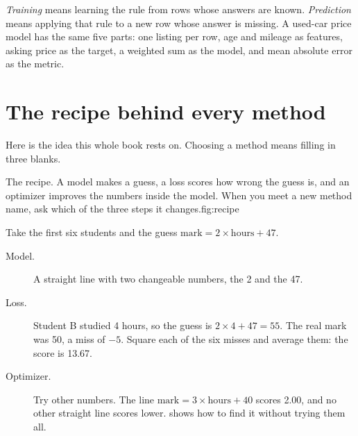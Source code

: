 \emph{Training} means learning the rule from rows whose answers are known. \emph{Prediction} means applying that rule to a new row whose answer is missing. A used-car price model has the same five parts: one listing per row, age and mileage as features, asking price as the target, a weighted sum as the model, and mean absolute error as the metric.

\section{The recipe behind every method}
\label{sec:recipe}

Here is the idea this whole book rests on. Choosing a method means filling in three blanks.

\begin{utpfig}{The recipe. A model makes a guess, a loss scores how wrong the guess is, and an optimizer improves the numbers inside the model. When you meet a new method name, ask which of the three steps it changes.}{fig:recipe}
\end{utpfig}

\begin{workedexample}
Take the first six students and the guess $\text{mark}=2\times\text{hours}+47$.
\begin{description}
  \item[Model.] A straight line with two changeable numbers, the 2 and the 47.
  \item[Loss.] Student B studied 4 hours, so the guess is $2\times4+47=55$. The real mark was 50, a miss of $-5$. Square each of the six misses and average them: the score is 13.67.
  \item[Optimizer.] Try other numbers. The line $\text{mark}=3\times\text{hours}+40$ scores 2.00, and no other straight line scores lower.  shows how to find it without trying them all.
\end{description}
\end{workedexample}

